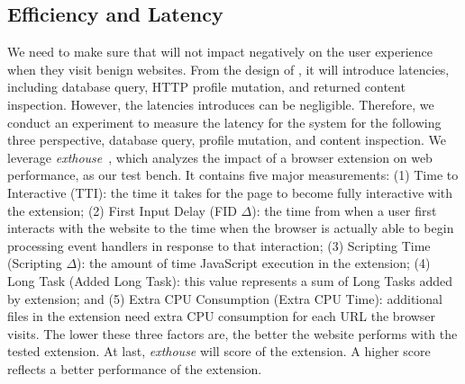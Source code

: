 \subsection{Efficiency and Latency}

We need to make sure that \spartacus will not impact negatively on the user experience when they visit benign websites.
From the design of \spartacus, it will introduce latencies, including database query, HTTP profile mutation, and returned content inspection.
However, the latencies \spartacus introduces can be negligible.
Therefore, we conduct an experiment to measure the latency for the \spartacus system for the following three perspective, database query, profile mutation, and content inspection.
We leverage \emph{exthouse}~\cite{exthouse}, which analyzes the impact of a browser extension on web performance, as our test bench.
It contains five major measurements:
(1) Time to Interactive (TTI): the time it takes for the page to become fully interactive with the extension; 
(2) First Input Delay (FID $\Delta$): the time from when a user first interacts with the website to the time when the browser is actually able to begin processing event handlers in response to that interaction;
(3) Scripting Time (Scripting $\Delta$): the amount of time JavaScript execution in the extension;
(4) Long Task (Added Long Task): this value represents a sum of Long Tasks added by extension;
and (5) Extra CPU Consumption (Extra CPU Time): additional files in the extension need extra CPU consumption for each URL the browser visits.
The lower these three factors are, the better the website performs with the tested extension.
At last, \emph{exthouse} will score of the extension.
A higher score reflects a better performance of the extension.

\exthouse

